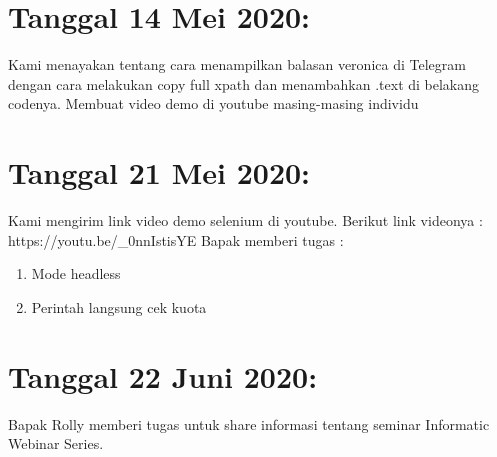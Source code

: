 \documentclass{article}
\newcounter{saveenumi}
\newcommand{\seti}{\setcounter{saveenumi}{\value{enumi}}} %
\begin{document}
\section{Tanggal 14 Mei 2020:}
Kami menayakan tentang cara menampilkan balasan veronica di Telegram dengan cara melakukan copy full xpath dan menambahkan .text di belakang codenya.
Membuat video demo di youtube masing-masing individu
	\newline
	\newline


\section{Tanggal 21 Mei 2020:}
Kami mengirim link video demo selenium di youtube. Berikut link videonya :
https://youtu.be/\_0nnIstisYE
	\newline
	Bapak memberi tugas :
	\begin{enumerate}
		\item Mode headless
		\newline
		\item Perintah langsung cek kuota 
		\newline
		\seti %
	\end{enumerate}
	
\section{Tanggal 22 Juni 2020:}
Bapak Rolly memberi tugas untuk share informasi tentang seminar Informatic Webinar Series.
	\newline
	\newline


	
\end{document}
